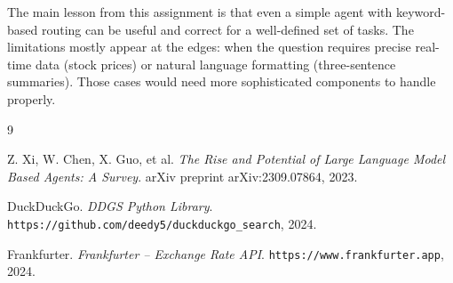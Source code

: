 \documentclass[11pt,a4paper]{article}
\begin{document}
The main lesson from this assignment is that even a simple agent with keyword-based routing can be useful and correct for a well-defined set of tasks. The limitations mostly appear at the edges: when the question requires precise real-time data (stock prices) or natural language formatting (three-sentence summaries). Those cases would need more sophisticated components to handle properly.

\begin{thebibliography}{9}

Z. Xi, W. Chen, X. Guo, et al.
\textit{The Rise and Potential of Large Language Model Based Agents: A Survey}.
arXiv preprint arXiv:2309.07864, 2023.

DuckDuckGo.
\textit{DDGS Python Library}.
\texttt{https://github.com/deedy5/duckduckgo\_search}, 2024.

Frankfurter.
\textit{Frankfurter -- Exchange Rate API}.
\texttt{https://www.frankfurter.app}, 2024.

\end{thebibliography}
\end{document}
